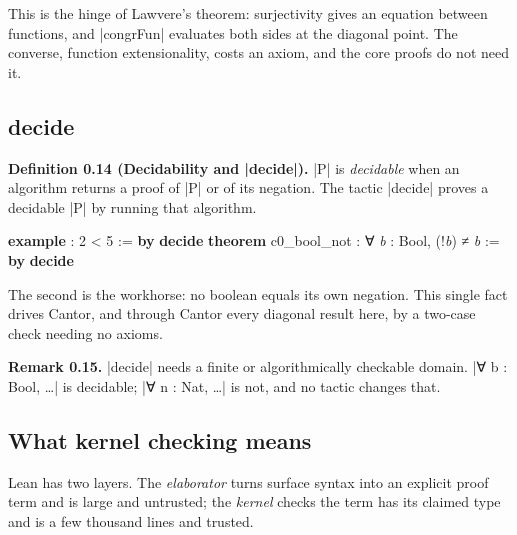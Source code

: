 \documentclass{memoir}
\begin{document}
This is the hinge of Lawvere's theorem: surjectivity gives an equation between
functions, and \LeanVerb|congrFun| evaluates both sides at the diagonal point. The
converse, function extensionality, costs an axiom, and the core proofs do not
need it.



\subsection{decide}\label{Two--Schemas--of--Impossibility-005F-005F-005F--Machine--Checked--Limits--of--Trustworthy--Machine--Learning-005F-005F-005F--and--Why--They--Tighten--with--Capability----Preliminaries----How--to--read--the--Lean--4----decide}

\textbf{Definition 0.14 (Decidability and \LeanVerb|decide|).} \LeanVerb|P| is \emph{decidable} when an
algorithm returns a proof of \LeanVerb|P| or of its negation. The tactic \LeanVerb|decide| proves
a decidable \LeanVerb|P| by running that algorithm.

\begin{LeanVerbatim}
\textbf{example} : 2 < 5 := \textbf{by} \textbf{decide}
\textbf{theorem} c0_bool_not : ∀ \textit{b} : Bool, (!\textit{b}) ≠ \textit{b} := \textbf{by} \textbf{decide}

\end{LeanVerbatim}


The second is the workhorse: no boolean equals its own negation. This single
fact drives Cantor, and through Cantor every diagonal result here, by a two-case
check needing no axioms.

\textbf{Remark 0.15.} \LeanVerb|decide| needs a finite or algorithmically checkable domain.
\LeanVerb|∀ b : Bool, …| is decidable; \LeanVerb|∀ n : Nat, …| is not, and no tactic changes that.



\subsection{What kernel checking means}\label{Two--Schemas--of--Impossibility-005F-005F-005F--Machine--Checked--Limits--of--Trustworthy--Machine--Learning-005F-005F-005F--and--Why--They--Tighten--with--Capability----Preliminaries----How--to--read--the--Lean--4----What--kernel--checking--means}

Lean has two layers. The \emph{elaborator} turns surface syntax into an explicit
proof term and is large and untrusted; the \emph{kernel} checks the term has its
claimed type and is a few thousand lines and trusted.
\end{document}
